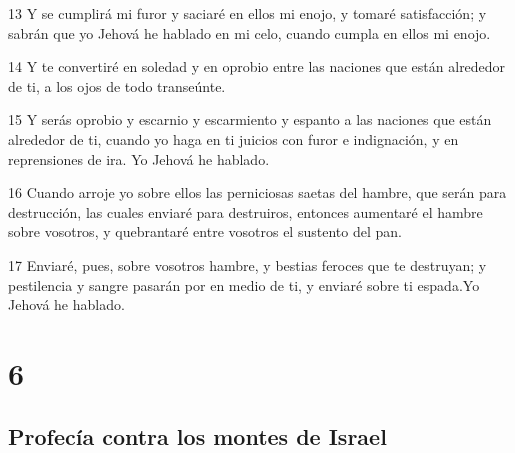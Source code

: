 \par 13 Y se cumplirá mi furor y saciaré en ellos mi enojo, y tomaré satisfacción; y sabrán que yo Jehová he hablado en mi celo, cuando cumpla en ellos mi enojo.
\par 14 Y te convertiré en soledad y en oprobio entre las naciones que están alrededor de ti, a los ojos de todo transeúnte.
\par 15 Y serás oprobio y escarnio y escarmiento y espanto a las naciones que están alrededor de ti, cuando yo haga en ti juicios con furor e indignación, y en reprensiones de ira. Yo Jehová he hablado.
\par 16 Cuando arroje yo sobre ellos las perniciosas saetas del hambre, que serán para destrucción, las cuales enviaré para destruiros, entonces aumentaré el hambre sobre vosotros, y quebrantaré entre vosotros el sustento del pan.
\par 17 Enviaré, pues, sobre vosotros hambre, y bestias feroces que te destruyan; y pestilencia y sangre pasarán por en medio de ti, y enviaré sobre ti espada.Yo Jehová he hablado.

\chapter{6}

\section*{Profecía contra los montes de Israel}

